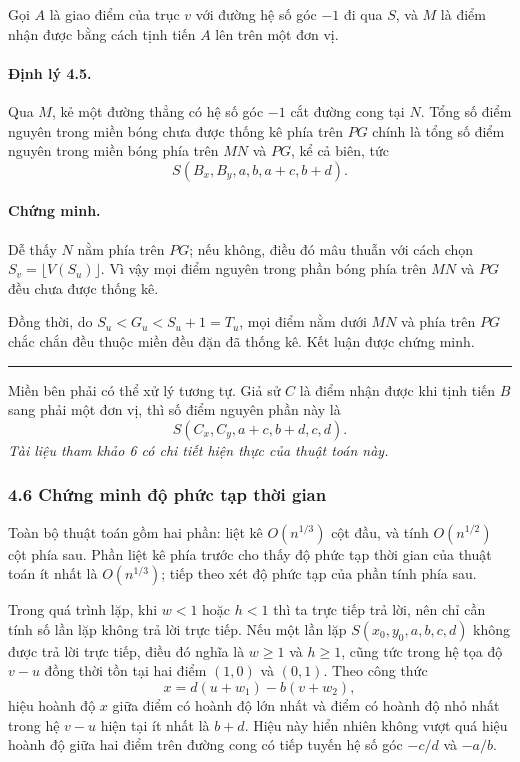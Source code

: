 \documentclass[11pt]{article}
\newcommand{\qedmark}{\hfill\rule{0.7ex}{0.7ex}}
\begin{document}
Gọi \(A\) là giao điểm của trục \(v\) với đường hệ số góc \(-1\) đi qua \(S\),
và \(M\) là điểm nhận được bằng cách tịnh tiến \(A\) lên trên một đơn vị.

\paragraph{Định lý 4.5.}
Qua \(M\), kẻ một đường thẳng có hệ số góc \(-1\) cắt đường cong tại \(N\).
Tổng số điểm nguyên trong miền bóng chưa được thống kê phía trên \(PG\) chính
là tổng số điểm nguyên trong miền bóng phía trên \(MN\) và \(PG\), kể cả biên,
tức
\[
  S(B_x,B_y,a,b,a+c,b+d).
\]

\paragraph{Chứng minh.}
Dễ thấy \(N\) nằm phía trên \(PG\); nếu không, điều đó mâu thuẫn với cách chọn
\(S_v=\lfloor V(S_u)\rfloor\). Vì vậy mọi điểm nguyên trong phần bóng phía trên
\(MN\) và \(PG\) đều chưa được thống kê.

Đồng thời, do \(S_u<G_u<S_u+1=T_u\), mọi điểm nằm dưới \(MN\) và phía trên
\(PG\) chắc chắn đều thuộc miền đều đặn đã thống kê. Kết luận được chứng minh.
\qedmark

Miền bên phải có thể xử lý tương tự. Giả sử \(C\) là điểm nhận được khi tịnh
tiến \(B\) sang phải một đơn vị, thì số điểm nguyên phần này là
\[
  S(C_x,C_y,a+c,b+d,c,d).
\]
\emph{Tài liệu tham khảo 6 có chi tiết hiện thực của thuật toán này.}

\subsubsection*{4.6 Chứng minh độ phức tạp thời gian}

Toàn bộ thuật toán gồm hai phần: liệt kê \(O(n^{1/3})\) cột đầu, và tính
\(O(n^{1/2})\) cột phía sau. Phần liệt kê phía trước cho thấy độ phức tạp thời
gian của thuật toán ít nhất là \(O(n^{1/3})\); tiếp theo xét độ phức tạp của
phần tính phía sau.

Trong quá trình lặp, khi \(w<1\) hoặc \(h<1\) thì ta trực tiếp trả lời, nên
chỉ cần tính số lần lặp không trả lời trực tiếp. Nếu một lần lặp
\(S(x_0,y_0,a,b,c,d)\) không được trả lời trực tiếp, điều đó nghĩa là
\(w\ge 1\) và \(h\ge 1\), cũng tức trong hệ tọa độ \(v-u\) đồng thời tồn tại
hai điểm \((1,0)\) và \((0,1)\). Theo công thức
\[
  x=d(u+w_1)-b(v+w_2),
\]
hiệu hoành độ \(x\) giữa điểm có hoành độ lớn nhất và điểm có hoành độ nhỏ
nhất trong hệ \(v-u\) hiện tại ít nhất là \(b+d\). Hiệu này hiển nhiên không
vượt quá hiệu hoành độ giữa hai điểm trên đường cong có tiếp tuyến hệ số góc
\(-c/d\) và \(-a/b\).
\end{document}
